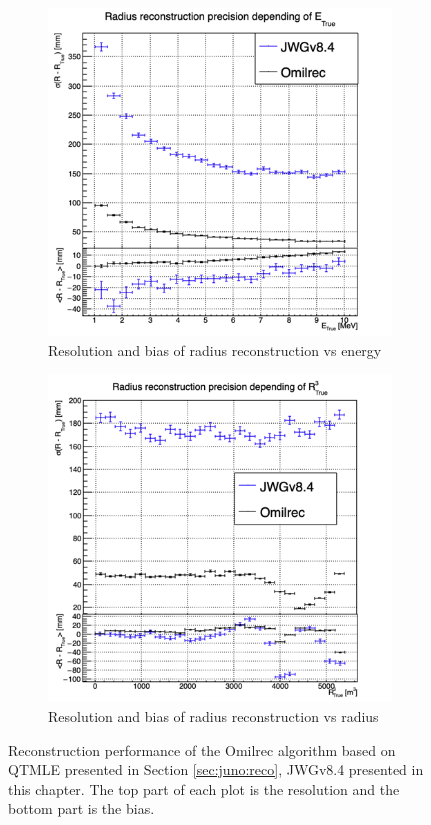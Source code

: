 \documentclass[../main.tex]{subfiles}
\begin{document}
\begin{figure}[ht]
  \begin{subfigure}[t]{0.48\linewidth}
    \centering
    \includegraphics[width=\linewidth]{images/jgnn/MSBvTE_nox.png}
    \caption{Resolution and bias of radius reconstruction vs energy}
    \label{fig:jgnn:MSBvETC_nox}
  \end{subfigure}
  \begin{subfigure}[t]{0.48\linewidth}
    \centering
    \includegraphics[width=\linewidth]{images/jgnn/MSBvRT_nox.png}
    \caption{Resolution and bias of radius reconstruction vs radius}
    \label{fig:jgnn:MSBvRTC_nox}
  \end{subfigure}
  \caption{Reconstruction performance of the Omilrec algorithm based on QTMLE presented in Section \ref{sec:juno:reco}, JWGv8.4 presented in this chapter. The top part of each plot is the resolution and the bottom part is the bias.}
  \label{fig:jgnn:results_nox_2}
\end{figure}
\end{document}
